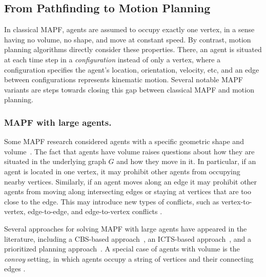 \documentclass[letterpaper]{article} %
\newcommand{\mapf}{\ac{MAPF}\xspace}
\newcommand{\comment}[1]{{\nb{\textbf{Comment:}}{orange}{#1}}}
\begin{document}
\subsection{From Pathfinding to Motion Planning}
In classical MAPF, agents are assumed to occupy exactly one vertex, in a sense having no volume, no shape, and move at constant speed. By contrast, motion planning algorithms directly consider these  properties. There, an agent is situated at each time step in a \emph{configuration} instead of only a vertex, where a configuration specifies the agent's location, orientation, velocity, etc, and an edge between configurations represents kinematic motion. Several notable \mapf variants are steps towards closing this gap between classical \mapf and motion planning. %

\subsubsection{\mapf with large agents.}
Some \mapf research considered agents with a specific geometric shape and volume~\cite{li2019multi,walker2018extended,yakovlev2017any,thomas2015extended}. The fact that agents have volume raises questions about how they are situated in the underlying graph $G$ and how they move in it. In particular, if an agent is located in one vertex, it may prohibit other agents from occupying nearby vertices. 
Similarly, if an agent moves along an edge it may prohibit other agents from moving along intersecting edges or staying at vertices that are too close to the edge. This may introduce new types of conflicts, such as vertex-to-vertex, edge-to-edge, and edge-to-vertex conflicts \cite{honig2018trajectory}. 


Several approaches for solving \mapf with large agents have appeared in the literature, including a CBS-based approach~\cite{li2019multi}, an ICTS-based approach~\cite{walker2018extended}, and a prioritized planning approach~\cite{yakovlev2017any}. A special case of agents with volume is the \emph{convoy} setting, in which agents occupy a string of vertices and their connecting edges \cite{thomas2015extended}.
\end{document}
